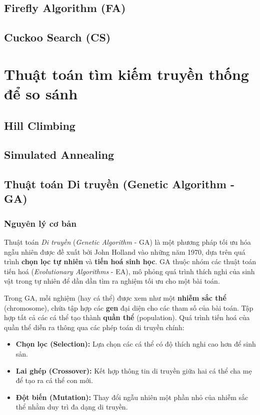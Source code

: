 \documentclass[a4paper]{report}
\begin{document}
\section{Firefly Algorithm (FA)}

\section{Cuckoo Search (CS)}

\chapter{Thuật toán tìm kiếm truyền thống để so sánh}
\section{Hill Climbing}
\section{Simulated Annealing}
\section{Thuật toán Di truyền (Genetic Algorithm - GA)}

\subsection{Nguyên lý cơ bản}
Thuật toán \textit{Di truyền} (\textit{Genetic Algorithm} - GA) là một phương pháp tối ưu hóa ngẫu nhiên được đề xuất bởi John Holland vào những năm 1970, dựa trên quá trình \textbf{chọn lọc tự nhiên} và \textbf{tiến hoá sinh học}.  
GA thuộc nhóm các thuật toán tiến hoá (\textit{Evolutionary Algorithms} - EA), mô phỏng quá trình thích nghi của sinh vật trong tự nhiên để dần dần tìm ra nghiệm tối ưu cho một bài toán.

Trong GA, mỗi nghiệm (hay cá thể) được xem như một \textbf{nhiễm sắc thể} (chromosome), chứa tập hợp các \textbf{gen} đại diện cho các tham số của bài toán. Tập hợp tất cả các cá thể tạo thành \textbf{quần thể} (population).  
Quá trình tiến hoá của quần thể diễn ra thông qua các phép toán di truyền chính:
\begin{itemize}
    \item \textbf{Chọn lọc (Selection):} Lựa chọn các cá thể có độ thích nghi cao hơn để sinh sản.
    \item \textbf{Lai ghép (Crossover):} Kết hợp thông tin di truyền giữa hai cá thể cha mẹ để tạo ra cá thể con mới.
    \item \textbf{Đột biến (Mutation):} Thay đổi ngẫu nhiên một phần nhỏ của nhiễm sắc thể nhằm duy trì đa dạng di truyền.
\end{itemize}
\end{document}
